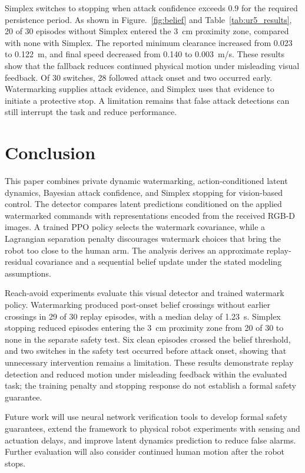 \documentclass[letterpaper, 10 pt, conference]{ieeeconf}
\theoremstyle{plain}
\begin{document}
Simplex switches to stopping when attack confidence exceeds $0.9$ for the required persistence period. As shown in Figure.~\ref{fig:belief} and Table~\ref{tab:ur5_results}, 20 of 30 episodes without Simplex entered the 3~cm proximity zone, compared with none with Simplex. The reported minimum clearance increased from 0.023 to 0.122~m, and final speed decreased from 0.140 to 0.003~m/s. These results show that the fallback reduces continued physical motion under misleading visual feedback. Of 30 switches, 28 followed attack onset and two occurred early. Watermarking supplies attack evidence, and Simplex uses that evidence to initiate a protective stop. A limitation remains that false attack detections can still interrupt the task and reduce performance.

\section{Conclusion}
This paper combines private dynamic watermarking, action-conditioned latent dynamics, Bayesian attack confidence, and Simplex stopping for vision-based control. The detector compares latent predictions conditioned on the applied watermarked commands with representations encoded from the received RGB-D images. A trained PPO policy selects the watermark covariance, while a Lagrangian separation penalty discourages watermark choices that bring the robot too close to the human arm. The analysis derives an approximate replay-residual covariance and a sequential belief update under the stated modeling assumptions.

Reach-avoid experiments evaluate this visual detector and trained watermark policy. Watermarking produced post-onset belief crossings without earlier crossings in 29 of 30 replay episodes, with a median delay of 1.23~s. Simplex stopping reduced episodes entering the 3~cm proximity zone from 20 of 30 to none in the separate safety test. Six clean episodes crossed the belief threshold, and two switches in the safety test occurred before attack onset, showing that unnecessary intervention remains a limitation. These results demonstrate replay detection and reduced motion under misleading feedback within the evaluated task; the training penalty and stopping response do not establish a formal safety guarantee.

Future work will use neural network verification tools to develop formal safety guarantees, extend the framework to physical robot experiments with sensing and actuation delays, and improve latent dynamics prediction to reduce false alarms. Further evaluation will also consider continued human motion after the robot stops.
\end{document}
